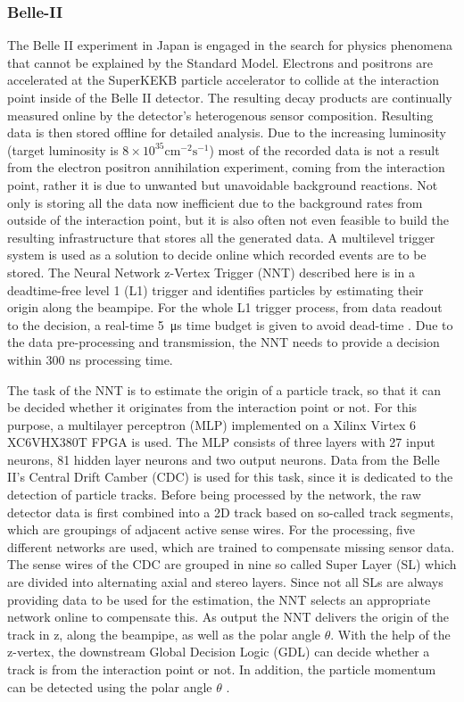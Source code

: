 \subsubsection{Belle-II}
The Belle II experiment in Japan is engaged in the search for physics phenomena that cannot be explained by the Standard Model. Electrons and positrons are accelerated at the SuperKEKB particle accelerator to collide at the interaction point inside of the Belle II detector. The resulting decay products are continually measured online by the detector’s heterogenous sensor composition. Resulting data is then stored offline for detailed analysis. Due to the increasing luminosity (target luminosity is $8\times10^{35}\mathrm{cm}^{-2}\mathrm{s}^{-1}$) most of the recorded data is not a result from the electron positron annihilation experiment, coming from the interaction point, rather it is due to unwanted but unavoidable background reactions. Not only is storing all the data now inefficient due to the background rates from outside of the interaction point, but it is also often not even feasible to build the resulting infrastructure that stores all the generated data.  A multilevel trigger system is used as a solution to decide online which recorded events are to be stored. The Neural Network z-Vertex Trigger (NNT) described here is in a deadtime-free level 1 (L1) trigger and identifies particles by estimating their origin along the beampipe. For the whole L1 trigger process, from data readout to the decision, a real-time 5~\si{\micro\second} time budget is given to avoid dead-time \cite{Lai_2020}. Due to the data pre-processing and transmission, the NNT needs to provide a decision within 300 ns processing time.

The task of the NNT is to estimate the origin of a particle track, so that it can be decided whether it originates from the interaction point or not. For this purpose, a multilayer perceptron (MLP) implemented on a Xilinx Virtex 6 XC6VHX380T FPGA is used. The MLP consists of three layers with 27 input neurons, 81 hidden layer neurons and two output neurons. Data from the Belle II's Central Drift Camber (CDC) is used for this task, since it is dedicated to the detection of particle tracks. Before being processed by the network, the raw detector data is first combined into a 2D track based on so-called track segments, which are groupings of adjacent active sense wires. For the processing, five different networks are used, which are trained to compensate missing sensor data. The sense wires of the CDC are grouped in nine so called Super Layer (SL) which are divided into alternating axial and stereo layers. Since not all SLs are always providing data to be used for the estimation, the NNT selects an appropriate network online to compensate this. As output the NNT delivers the origin of the track in z, along the beampipe, as well as the polar angle $\theta$. With the help of the z-vertex, the downstream Global Decision Logic (GDL) can decide whether a track is from the interaction point or not. In addition, the particle momentum can be detected using the polar angle $\theta$ \cite{baehr2019low}. 

